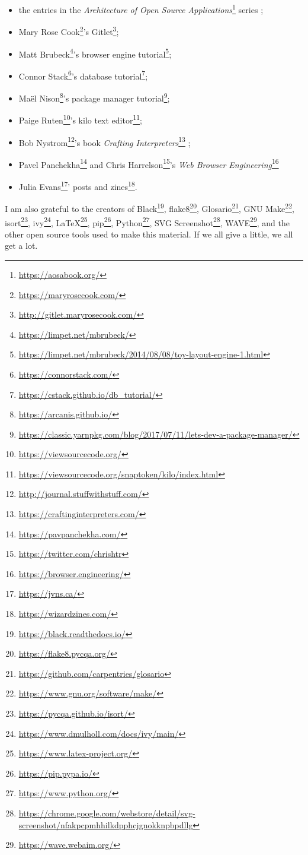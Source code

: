 \documentclass{scrbook}
\newcommand{\hreffoot}[2]{{#1}\footnote{\href{#2}{#2}}}
\begin{document}
\begin{itemize}

\item the entries in the \hreffoot{\emph{Architecture of Open Source Applications}}{https://aosabook.org/} series \cite{Brown2011,Brown2012,Armstrong2013,Brown2016};

\item \hreffoot{Mary Rose Cook}{https://maryrosecook.com/}'s \hreffoot{Gitlet}{http://gitlet.maryrosecook.com/};

\item \hreffoot{Matt Brubeck}{https://limpet.net/mbrubeck/}'s \hreffoot{browser engine tutorial}{https://limpet.net/mbrubeck/2014/08/08/toy-layout-engine-1.html};

\item \hreffoot{Connor Stack}{https://connorstack.com/}'s \hreffoot{database tutorial}{https://cstack.github.io/db\_tutorial/};

\item \hreffoot{Maël Nison}{https://arcanis.github.io/}'s \hreffoot{package manager tutorial}{https://classic.yarnpkg.com/blog/2017/07/11/lets-dev-a-package-manager/};

\item \hreffoot{Paige Ruten}{https://viewsourcecode.org/}'s \hreffoot{kilo text editor}{https://viewsourcecode.org/snaptoken/kilo/index.html};

\item \hreffoot{Bob Nystrom}{http://journal.stuffwithstuff.com/}'s book \hreffoot{\emph{Crafting Interpreters}}{https://craftinginterpreters.com/} \cite{Nystrom2021};

\item \hreffoot{Pavel Panchekha}{https://pavpanchekha.com/} and \hreffoot{Chris Harrelson}{https://twitter.com/chrishtr}'s \hreffoot{\emph{Web Browser Engineering}}{https://browser.engineering/}

\item \hreffoot{Julia Evans}{https://jvns.ca/}' posts and \hreffoot{zines}{https://wizardzines.com/}.

\end{itemize}


I am also grateful to the creators of
\hreffoot{Black}{https://black.readthedocs.io/},
\hreffoot{flake8}{https://flake8.pycqa.org/},
\hreffoot{Glosario}{https://github.com/carpentries/glosario},
\hreffoot{GNU Make}{https://www.gnu.org/software/make/},
\hreffoot{isort}{https://pycqa.github.io/isort/},
\hreffoot{ivy}{https://www.dmulholl.com/docs/ivy/main/},
\hreffoot{LaTeX}{https://www.latex-project.org/},
\hreffoot{pip}{https://pip.pypa.io/},
\hreffoot{Python}{https://www.python.org/},
\hreffoot{SVG Screenshot}{https://chrome.google.com/webstore/detail/svg-screenshot/nfakpcpmhhilkdpphcjgnokknpbpdllg},
\hreffoot{WAVE}{https://wave.webaim.org/},
and the other open source tools used to make this material.
If we all give a little,
we all get a lot.
\end{document}

